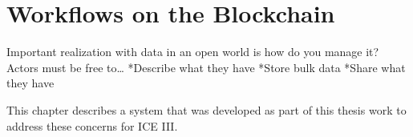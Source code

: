 \chapter{Workflows on the Blockchain} \label{ch:blockchain}

Important realization with data in an open world is how do you manage it? Actors
must be free to\ldots
*Describe what they have
*Store bulk data
*Share what they have

This chapter describes a system that was developed as part of this thesis work
to address these concerns for ICE III.

